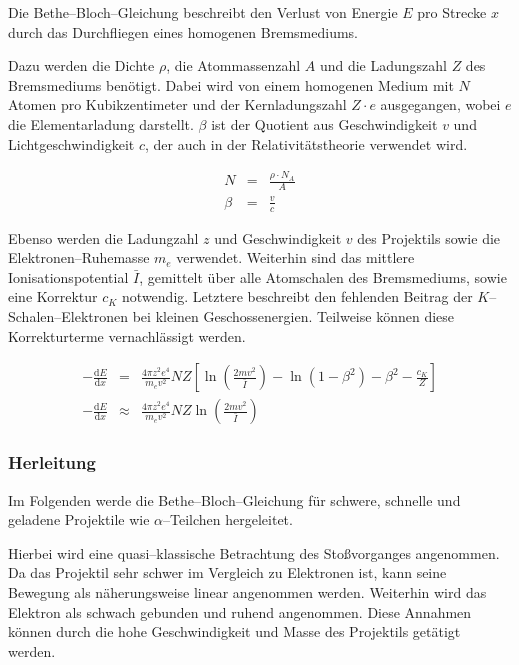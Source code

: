 \documentclass[12pt,a4paper]{scrartcl}
\numberwithin{equation}{section} %
\begin{document}
Die Bethe--Bloch--Gleichung beschreibt den Verlust von Energie $E$ pro Strecke $x$ durch das Durchfliegen eines homogenen Bremsmediums.

Dazu werden die Dichte $\rho$, die Atommassenzahl $A$ und die Ladungszahl $Z$ des Bremsmediums benötigt. Dabei wird von einem homogenen Medium mit $N$ Atomen pro Kubikzentimeter und der Kernladungszahl $Z\cdot e$ ausgegangen, wobei $e$ die Elementarladung darstellt. $\beta$ ist der Quotient aus Geschwindigkeit $v$ und Lichtgeschwindigkeit $c$, der auch in der Relativitätstheorie verwendet wird.

\begin{eqnarray}
    N &=& \frac{\rho\cdot N_A}{A} \\
    \beta &=& \frac{v}{c}
\end{eqnarray}

\noindent
Ebenso werden die Ladungzahl $z$ und Geschwindigkeit $v$ des Projektils sowie die Elektronen\allowbreak --Ruhemasse $m_e$ verwendet. Weiterhin sind das mittlere Ionisationspotential $\bar I$, gemittelt über alle Atomschalen des Bremsmediums, sowie eine Korrektur $c_K$ notwendig. Letztere beschreibt den fehlenden Beitrag der $K$--Schalen--Elektronen bei kleinen Geschossenergien. Teilweise können diese Korrekturterme vernachlässigt werden.

\begin{eqnarray}
    -\frac{\mathrm dE}{\mathrm dx} &=&
        \frac{4\pi z^2 e^4}{m_e v^2} NZ
        \left[
            \ln\left(\frac{2mv^2}{\bar I}\right)
            - \ln\left(1 - \beta^2\right)
            - \beta^2
            - \frac{c_K}{Z}
        \right]
        \label{BetheBloch} \\
    -\frac{\mathrm dE}{\mathrm dx} &\approx&
        \frac{4\pi z^2 e^4}{m_e v^2} NZ
        \ln\left(\frac{2mv^2}{\bar I}\right)
        \label{BetheBloch2}
\end{eqnarray}

\hypertarget{herleitung}{%
\subsubsection{Herleitung}\label{herleitung}}

Im Folgenden werde die Bethe--Bloch--Gleichung für schwere, schnelle und geladene Projektile wie $\alpha$--Teilchen hergeleitet.

Hierbei wird eine quasi--klassische Betrachtung des Stoßvorganges angenommen. Da das Projektil sehr schwer im Vergleich zu Elektronen ist, kann seine Bewegung als näherungsweise linear angenommen werden. Weiterhin wird das Elektron als schwach gebunden und ruhend angenommen. Diese Annahmen können durch die hohe Geschwindigkeit und Masse des Projektils getätigt werden.
\end{document}
